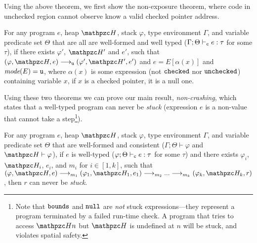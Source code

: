 Using the above theorem, we first show the non-exposure theorem,
where code in unchecked region cannot observe know a valid checked pointer address.

\begin{thm}
For any \systemname program $e$, heap $\heap$, stack
$\varphi$, type environment $\Gamma$, and variable predicate set $\Theta$
that are all are well-formed and well
typed ($\Gamma;\Theta\vdash_{\texttt{c}} e : \tau$ for some $\tau$), if there exists $\varphi'$,
$\heap'$ and $e'$, such that $(\varphi,\heap,e)
\longrightarrow_{\umode} (\varphi',\heap',e')$ and $e=E[\alpha(x)]$ and $\textit{mode}(E)=\texttt{u}$,
where $\alpha(x)$ is some expression (not $\mathtt{checked}$ nor $\mathtt{unchecked}$) containing variable $x$, if $x$ is a checked pointer, it is a null one.
\end{thm}

Using these two theorems we can prove our main result, {\em non-crashing},
which states that a well-typed program can never be \emph{stuck} (expression
$e$ is a non-value that cannot take a step\footnote{Note that
  $\mathtt{bounds}$ and $\mathtt{null}$ are \emph{not} stuck expressions---they represent a
  program terminated by a failed run-time check. A program that tries to access $\heap{n}$
  but $\heap$ is undefined at $n$ will be stuck, and violates spatial
  safety.}).


\begin{thm}\label{thm:blame} For any \systemname
  program $e$, heap $\heap$, stack
$\varphi$, type environment $\Gamma$, and variable predicate set $\Theta$
that are well-formed and consistent
($\Gamma;\Theta\vdash \varphi$ and $\heap \vdash \varphi$),
if $e$ is well-typed ($\varphi;\Theta\vdash_{\texttt{c}} e :
\tau$ for some $\tau$) and there exists
$\varphi_i$, $\heap_i$, $e_i$, and $m_i$ for $i\in [1,k]$, such that
$(\varphi,\heap,e) \longrightarrow_{m_1} (\varphi_1,\heap_1,e_1)\longrightarrow_{m_2} ...\longrightarrow_{m_k} (\varphi_k,\heap_k,r)$, then $r$ can never be \emph{stuck}.
\end{thm}

